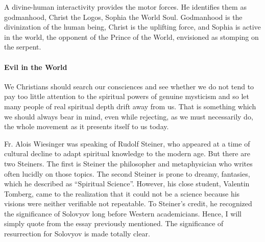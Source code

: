 A divine-human interactivity provides the motor forces. He identifies them as godmanhood, Christ the Logos, Sophia the World Soul. Godmanhood is the divinization of the human being, Christ is the uplifting force, and Sophia is active in the world, the opponent of the Prince of the World, envisioned as stomping on the serpent.

\paragraph{Evil in the World}


\begin{quotex}
We Christians should search our consciences and see whether we do not tend to pay too little attention to the spiritual powers of genuine mysticism and so let many people of real spiritual depth drift away from us. That is something which we should always bear in mind, even while rejecting, as we must necessarily do, the whole movement as it presents itself to us today.
\end{quotex}


Fr. Alois Wiesinger was speaking of Rudolf Steiner, who appeared at a time of cultural decline to adapt spiritual knowledge to the modern age. But there are two Steiners. The first is Steiner the philosopher and metaphysician who writes often lucidly on those topics. The second Steiner is prone to dreamy, fantasies, which he described as ``Spiritual Science''. However, his close student, Valentin Tomberg, came to the realization that it could not be a science because his visions were neither verifiable not repeatable. To Steiner's credit, he recognized the significance of Solovyov long before Western academicians. Hence, I will simply quote from the essay previously mentioned. The significance of resurrection for Solovyov is made totally clear.

